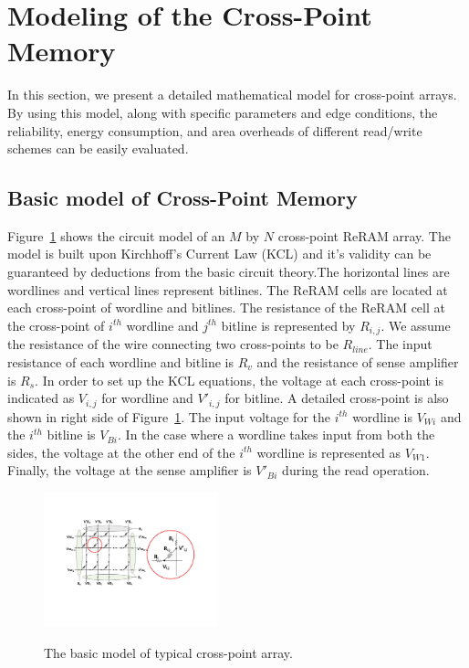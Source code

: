 \section{Modeling of the Cross-Point Memory}\label{sec:model}

In this section, we present a detailed mathematical model for cross-point
arrays. By using this model, along with specific parameters and edge
conditions, the reliability, energy consumption, and area overheads of
different read/write schemes can be easily evaluated.

\subsection{Basic model of Cross-Point Memory}
Figure~\ref{fig:modeling} shows the circuit model of an $M$ by $N$
cross-point ReRAM array. The model is built upon Kirchhoff's Current Law
(KCL) and it's validity can be guaranteed by deductions from the basic
circuit theory.The horizontal lines are wordlines and vertical lines
represent bitlines. The ReRAM cells are located at each cross-point of
wordline and bitlines. The resistance of the ReRAM cell at the cross-point
of $i^{th}$ wordline and $j^{th}$ bitline is represented by $R_{i,j}$. We
assume the resistance of the wire connecting two cross-points to be
$R_{line}$. The input resistance of each wordline and bitline is $R_v$ and
the resistance of sense amplifier is $R_s$. In order to set up the KCL
equations, the voltage at each cross-point is indicated as $V_{i,j}$ for
wordline and $V'_{i,j}$ for bitline. A detailed cross-point is also shown
in right side of Figure~\ref{fig:modeling}. The input voltage for the
$i^{th}$ wordline is $V_{Wi}$ and the $i^{th}$ bitline is $V_{Bi}$. In the
case where a wordline takes input from both the sides, the voltage at the
other end of the $i^{th}$ wordline is represented as $V_{W1}$. Finally,
the voltage at the sense amplifier is $V'_{Bi}$ during the read operation.


\begin{figure}%
\centering
  \includegraphics[width=0.45\textwidth]{./figures/model_f.pdf}\\
  \caption{The basic model of typical cross-point array.}\label{fig:modeling}
  \vspace{-12pt}
\end{figure}

